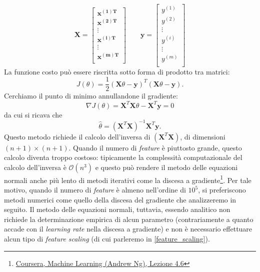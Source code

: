 \begin{equation*}
\mathbf{X} = \begin{bmatrix}
 \mathbf{x^{(1)T}}\\
 \mathbf{x^{(2)T}}\\
 \vdots \\
  \mathbf{x^{(i)T}}\\
  \vdots \\
   \mathbf{x^{(m)T}}\\
\end{bmatrix} \qquad
\mathbf{y} = \begin{bmatrix}
 y^{(1)}\\
 y^{(2)}\\
 \vdots \\
 y^{(i)}\\
  \vdots \\
 y^{(m)}\\
\end{bmatrix}
\end{equation*}
La funzione costo può essere riscritta sotto forma di prodotto tra matrici:
\begin{equation*}
J(\theta) = \frac{1}{2} (\mathbf{X}\theta - \mathbf{y})^T (\mathbf{X}\theta - \mathbf{y}).
\end{equation*}
Cerchiamo il punto di minimo annullandone il gradiente:
\begin{equation*}
\nabla J(\theta) = \mathbf{X}^T\mathbf{X}\theta - \mathbf{X}^T \mathbf{y} = 0
\end{equation*}
da cui si ricava che
\begin{equation*}
\hat\theta = (\mathbf{X}^T\mathbf{X})^{-1} \mathbf{X}^T \mathbf{y}.
\end{equation*}
Questo metodo richiede il calcolo dell'inversa di $(\mathbf{X}^T\mathbf{X})$, di dimensioni $(n+1) \times (n+1)$. Quando il numero di \emph{feature} è piuttosto grande, questo calcolo diventa troppo costoso: tipicamente la complessità computazionale del calcolo dell'inversa è $\mathcal{O}(n^3)$ e questo può rendere il metodo delle equazioni normali anche più lento di metodi iterativi come la discesa a gradiente\footnote{\href{http://www.youtube.com/watch?v=B3vseKmgi8E}{{Coursera, Machine Learning (Andrew Ng), Lezione 4.6}}}. Per tale motivo, quando il numero di \emph{feature} è almeno nell'ordine di $10^5$, si preferiscono metodi numerici come quello della discesa del gradiente che analizzeremo in seguito. Il metodo delle equazioni normali, tuttavia, essendo analitico non richiede la determinazione empirica di alcun parametro (contrariamente a quanto accade con il \emph{learning rate} nella discesa a gradiente) e non è necessario effettuare alcun tipo di \emph{feature scaling} (di cui parleremo in \autoref{feature_scaling}).

